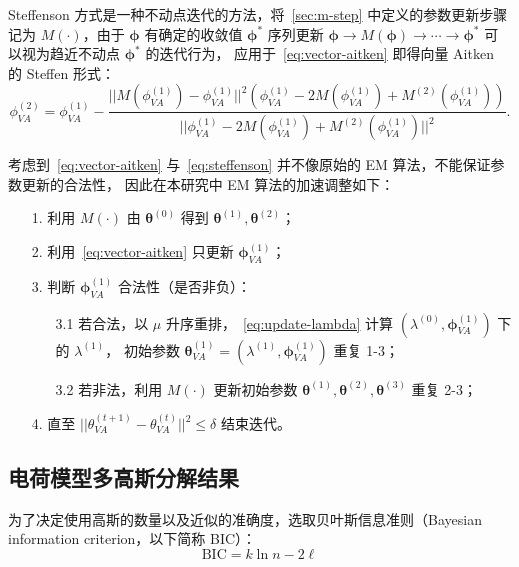 Steffenson 方式是一种不动点迭代的方法，将~\ref{sec:m-step} 中定义的参数更新步骤记为 $M(\cdot)$，由于 $\boldsymbol{\phi}$ 有确定的收敛值 $\boldsymbol{\phi}^*$
序列更新 $\boldsymbol{\phi}\rightarrow M(\boldsymbol{\phi})\rightarrow\cdots\rightarrow\boldsymbol{\phi}^{*}$ 可以视为趋近不动点 $\boldsymbol{\phi}^*$ 的迭代行为，
应用于~\eqref{eq:vector-aitken} 即得向量 Aitken 的 Steffen 形式：
\begin{equation}
    \label{eq:steffenson}
    \phi_{VA}^{(2)}=\phi_{VA}^{(1)}-\frac{||M(\phi_{VA}^{(1)})-
    \phi_{VA}^{(1)}||^2(\phi_{VA}^{(1)}-2M(\phi_{VA}^{(1)})+M^{(2)}
    (\phi_{VA}^{(1)}))}{||\phi_{VA}^{(1)}-2M(\phi_{VA}^{(1)})+M^{(2)}(\phi_{VA}^{(1)})||^2}.
\end{equation}

考虑到~\eqref{eq:vector-aitken} 与~\eqref{eq:steffenson} 并不像原始的 EM 算法，不能保证参数更新的合法性，
因此在本研究中 EM 算法的加速调整如下：
\begin{enumerate}
    \item[1.] 利用 $M(\cdot)$ 由 $\boldsymbol{\theta}^{(0)}$ 得到 $\boldsymbol{\theta}^{(1)}, \boldsymbol{\theta}^{(2)}$；
    \item[2.] 利用~\eqref{eq:vector-aitken} 只更新 $\boldsymbol{\phi}_{VA}^{(1)}$；
    \item[3.] 判断 $\boldsymbol{\phi}_{VA}^{(1)}$ 合法性（是否非负）：
    \begin{enumerate}
        \item[3.1 ] 若合法，以 $\mu$ 升序重排，~\eqref{eq:update-lambda} 计算 $(\lambda^{(0)}, \boldsymbol{\phi}_{VA}^{(1)})$ 下的 $\lambda^{(1)}$，
        初始参数 $\boldsymbol{\theta}_{VA}^{(1)}=(\lambda^{(1)}, \boldsymbol{\phi}_{VA}^{(1)})$ 重复 1-3；
        \item[3.2 ] 若非法，利用 $M(\cdot)$ 更新初始参数 $\boldsymbol{\theta}^{(1)},\boldsymbol{\theta}^{(2)}, \boldsymbol{\theta}^{(3)}$ 重复 2-3；
    \end{enumerate}
    \item[4.] 直至 $||\theta_{VA}^{(t+1)}-\theta_{VA}^{(t)}||^2\leq\delta$ 结束迭代。
\end{enumerate}

\subsection{电荷模型多高斯分解结果}

为了决定使用高斯的数量以及近似的准确度，选取贝叶斯信息准则（Bayesian information criterion，以下简称 BIC）：
\begin{equation}
    \label{eq:bic}
    \text{BIC}=k\ln{n}-2\ell
\end{equation}

